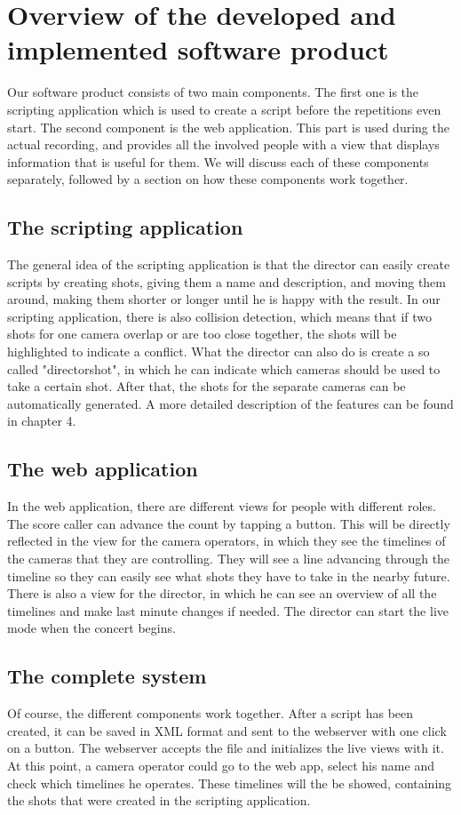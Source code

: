 \section{Overview of the developed and implemented software product}

Our software product consists of two main components. The first one is the scripting application which is used to create a script before the repetitions even start. The second component is the web application. This part is used during the actual recording, and provides all the involved people with a view that displays information that is useful for them. We will discuss each of these components separately, followed by a section on how these components work together.

\subsection{The scripting application}
The general idea of the scripting application is that the director can easily create scripts by creating shots, giving them a name and description, and moving them around, making them shorter or longer until he is happy with the result. In our scripting application, there is also collision detection, which means that if two shots for one camera overlap or are too close together, the shots will be highlighted to indicate a conflict. What the director can also do is create a so called "directorshot", in which he can indicate which cameras should be used to take a certain shot. After that, the shots for the separate cameras can be automatically generated. A more detailed description of the features can be found in chapter 4.

\subsection{The web application}
In the web application, there are different views for people with different roles. The score caller can advance the count by tapping a button. This will be directly reflected in the view for the camera operators, in which they see the timelines of the cameras that they are controlling. They will see a line advancing through the timeline so they can easily see what shots they have to take in the nearby future. There is also a view for the director, in which he can see an overview of all the timelines and make last minute changes if needed. The director can start the live mode when the concert begins.

\subsection{The complete system}
Of course, the different components work together. After a script has been created, it can be saved in XML format and sent to the webserver with one click on a button. The webserver accepts the file and initializes the live views with it. At this point, a camera operator could go to the web app, select his name and check which timelines he operates. These timelines will the be showed, containing the shots that were created in the scripting application.\\

